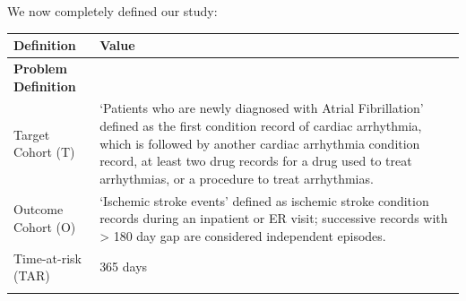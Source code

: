 \documentclass[]{article}
\begin{document}
We now completely defined our study:

\begin{longtable}[]{@{}ll@{}}
\toprule
\begin{minipage}[b]{0.42\columnwidth}\raggedright\strut
Definition\strut
\end{minipage} & \begin{minipage}[b]{0.51\columnwidth}\raggedright\strut
Value\strut
\end{minipage}\tabularnewline
\midrule
\endhead
\begin{minipage}[t]{0.42\columnwidth}\raggedright\strut
\textbf{Problem Definition}\strut
\end{minipage} & \begin{minipage}[t]{0.51\columnwidth}\raggedright\strut
\strut
\end{minipage}\tabularnewline
\begin{minipage}[t]{0.42\columnwidth}\raggedright\strut
Target Cohort (T)\strut
\end{minipage} & \begin{minipage}[t]{0.51\columnwidth}\raggedright\strut
`Patients who are newly diagnosed with Atrial Fibrillation' defined as
the first condition record of cardiac arrhythmia, which is followed by
another cardiac arrhythmia condition record, at least two drug records
for a drug used to treat arrhythmias, or a procedure to treat
arrhythmias.\strut
\end{minipage}\tabularnewline
\begin{minipage}[t]{0.42\columnwidth}\raggedright\strut
Outcome Cohort (O)\strut
\end{minipage} & \begin{minipage}[t]{0.51\columnwidth}\raggedright\strut
`Ischemic stroke events' defined as ischemic stroke condition records
during an inpatient or ER visit; successive records with \textgreater{}
180 day gap are considered independent episodes.\strut
\end{minipage}\tabularnewline
\begin{minipage}[t]{0.42\columnwidth}\raggedright\strut
Time-at-risk (TAR)\strut
\end{minipage} & \begin{minipage}[t]{0.51\columnwidth}\raggedright\strut
365 days\strut
\end{minipage}\tabularnewline
\begin{minipage}[t]{0.42\columnwidth}\raggedright\strut
\strut
\end{minipage} & \begin{minipage}[t]{0.51\columnwidth}\raggedright\strut

\end{minipage}
\end{longtable}
\end{document}

